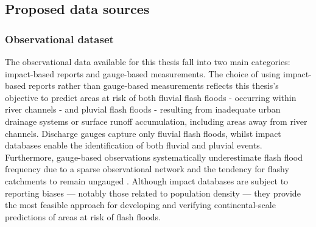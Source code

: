 \subsection{Proposed data sources}
\label{integrated_experimental_strategy_data_requirements_final_selection}

\subsubsection{Observational dataset}

The  observational data available for this thesis fall into two main categories: impact-based reports and gauge-based measurements. The choice of using impact-based reports rather than gauge-based measurements reflects this thesis's objective to predict areas at risk of both fluvial flash floods - occurring within river channels - and pluvial flash floods - resulting from inadequate urban drainage systems or surface runoff accumulation, including areas away from river channels. Discharge gauges capture only fluvial flash floods, whilst impact databases enable the identification of both fluvial and pluvial events. Furthermore, gauge-based observations systematically underestimate flash flood frequency due to a sparse observational network and the tendency for flashy catchments to remain ungauged \citep{Gaume_2009, Gaume_2016}. Although impact databases are subject to reporting biases — notably those related to population density \citep{Marjerison_2016} — they provide the most feasible approach for developing and verifying continental-scale predictions of areas at risk of flash floods.

